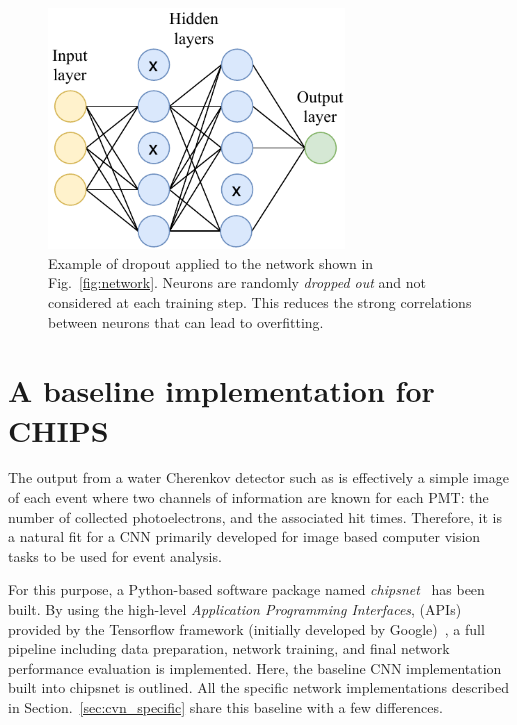 \begin{figure} %
    \includegraphics[width=0.7\textwidth]{diagrams/6-cvn/dropout.pdf}
    \caption[Illustration of dropout.]
    {Example of dropout applied to the network shown in Fig.~\ref{fig:network}. Neurons are
        randomly \emph{dropped out} and not considered at each training step. This reduces the
        strong correlations between neurons that can lead to overfitting.}
    \label{fig:dropout}
\end{figure}

\section{A baseline implementation for CHIPS} %
\label{sec:cvn_baseline} %

The output from a water Cherenkov detector such as \chips is effectively a simple image of each
event where two channels of information are known for each PMT: the number of collected
photoelectrons, and the associated hit times. Therefore, it is a natural fit for a CNN primarily
developed for image based computer vision tasks to be used for \chips event analysis.

For this purpose, a Python-based software package named \emph{chipsnet}~\cite{chipsnet2020} has
been built. By using the high-level \emph{Application Programming Interfaces}, (APIs) provided by
the Tensorflow framework (initially developed by Google)~\cite{tf2015}, a full pipeline including
data preparation, network training, and final network performance evaluation is implemented. Here,
the baseline CNN implementation built into chipsnet is outlined. All the specific network
implementations described in Section.~\ref{sec:cvn_specific} share this baseline with a few
differences.

